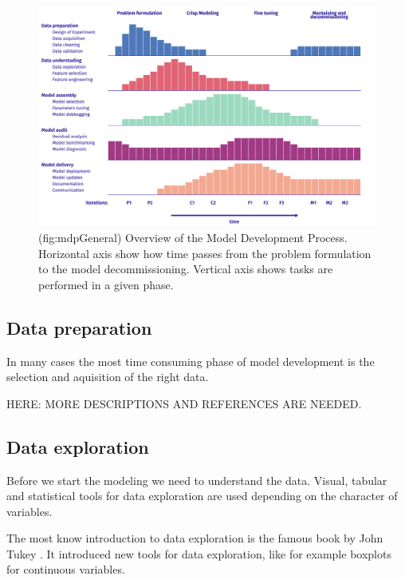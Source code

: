 \documentclass[12pt,]{krantz}
\begin{document}
\begin{figure}

{\centering \includegraphics[width=0.99\linewidth]{figure/mdp_general} 

}

\caption{(fig:mdpGeneral) Overview of the Model Development Process. Horizontal axis show how time passes from the problem formulation to the model decommissioning. Vertical axis shows tasks are performed in a given phase. }\label{fig:mdpGeneral}
\end{figure}

\hypertarget{data-preparation}{%
\subsection{Data preparation}\label{data-preparation}}

In many cases the most time consuming phase of model development is the selection and aquisition of the right data.

HERE: MORE DESCRIPTIONS AND REFERENCES ARE NEEDED.

\hypertarget{data-exploration}{%
\subsection{Data exploration}\label{data-exploration}}

Before we start the modeling we need to understand the data.
Visual, tabular and statistical tools for data exploration are used depending on the character of variables.

The most know introduction to data exploration is the famous book by John Tukey \citep{tukey1977}. It introduced new tools for data exploration, like for example boxplots for continuous variables.
\end{document}
